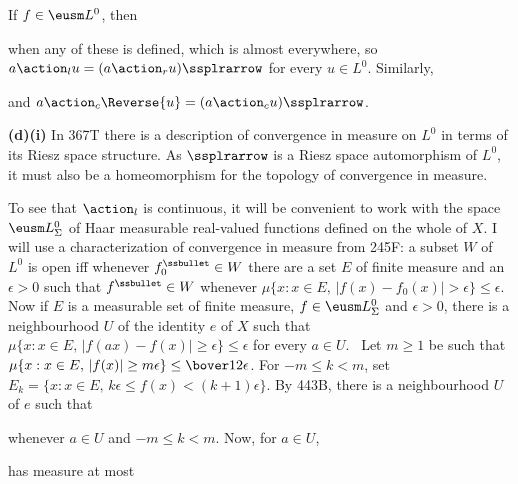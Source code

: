 {\medskip

 If $f\in\eusm L^0$, then


\noindent when any of these is defined, which is almost everywhere, so
$a\action_lu=(a\action_ru)\ssplrarrow$ for every $u\in L^0$.
Similarly,


\noindent and $a\action_c\Reverse{u}=(a\action_cu)\ssplrarrow$.

\medskip

{\bf (d)(i)} In 367T there is a description of convergence in measure on
$L^0$ in terms of its Riesz space structure.   As $\ssplrarrow$ is a Riesz
space automorphism of $L^0$, it must also be a homeomorphism for the
topology of convergence in measure.

\medskip

 To see that $\action_l$ is continuous,
it will be convenient to work
with the space $\eusm L^0_{\Sigma}$ of Haar measurable
real-valued functions
defined on the whole of $X$.   I will use a characterization of
convergence in measure from 245F:  a subset $W$ of $L^0$ is open iff
whenever $f_0^{\ssbullet}\in W$ there are a set $E$ of finite measure
and an $\epsilon>0$ such that $f^{\ssbullet}\in W$ whenever
$\mu\{x:x\in E,\,|f(x)-f_0(x)|>\epsilon\}\le\epsilon$.   Now if $E$ is a
measurable
set of finite measure, $f\in\eusm L^0_{\Sigma}$ and $\epsilon>0$,
there is a neighbourhood $U$ of the identity $e$ of $X$ such that
$\mu\{x:x\in E,\,|f(ax)-f(x)|\ge\epsilon\}\le\epsilon$ for every $a\in U$.
\Prf\ Let $m\ge 1$ be such that
$\mu\{x:x\in E,\,|f(x)|\ge m\epsilon\}\le\bover12\epsilon$.   For
$-m\le k<m$, set
$E_k=\{x:x\in E,\,k\epsilon\le f(x)<(k+1)\epsilon\}$.   By 443B, there
is a neighbourhood $U$ of $e$ such that


\noindent whenever $a\in U$ and $-m\le k<m$.   Now, for $a\in U$,


\noindent has measure at most

}
